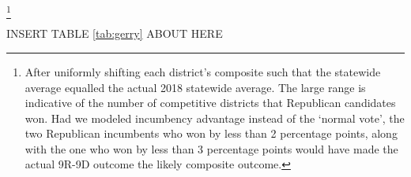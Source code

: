         \footnote{After uniformly shifting each district's composite such that the statewide average equalled the actual 2018 statewide average. The large range is indicative of the number of competitive districts that Republican candidates won. Had we modeled incumbency advantage instead of the `normal vote', the two Republican incumbents who won by less than 2 percentage points, along with the one who won by less than 3 percentage points would have made the actual 9R-9D outcome the likely composite outcome.}


%    
\begin{center} INSERT TABLE \ref{tab:gerry} ABOUT HERE \end{center}

